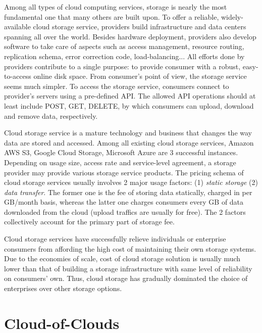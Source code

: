 Among all types of cloud computing services, storage is nearly the most fundamental one that many others are built upon. To offer a reliable, widely-available cloud storage service, providers build infrastructure and data centers spanning all over the world. Besides hardware deployment, providers also develop software to take care of aspects such as access management, resource routing, replication schema, error correction code, load-balancing... All efforts done by providers contribute to a single purpose: to provide consumer with a robust, easy-to-access online disk space. From consumer's point of view, the storage service seems much simpler. To access the storage service, consumers connect to provider's servers using a pre-defined API. The allowed API operations should at least include POST, GET, DELETE, by which consumers can upload, download and remove data, respectively.

Cloud storage service is a mature technology and business that changes the way data are stored and accessed. Among all existing cloud storage services, Amazon AWS S3\cite{awss3}, Google Cloud Storage\cite{googlecloudstorage}, Microsoft Azure\cite{msazurestorage} are 3 successful instances. Depending on usage size, access rate and service-level agreement, a storage provider may provide various storage service products. The pricing schema of cloud storage services usually involves 2 major usage factors: (1) \textit{static storage} (2) \textit{data transfer}. The former one is the fee of storing data statically, charged in per GB/month basis, whereas the latter one charges consumers every GB of data downloaded from the cloud (upload traffics are usually for free). The 2 factors collectively account for the primary part of storage fee.

Cloud storage services have successfully relieve individuals or enterprise consumers from affording the high cost of maintaining their own storage systems. Due to the economies of scale, cost of cloud storage solution is usually much lower than that of building a storage infrastructure with same level of reliability on consumers' own. Thus, cloud storage has gradually dominated the choice of enterprises over other storage options\cite{storagetrends2018}.

\section{Cloud-of-Clouds}
\label{s:cloudofclouds}


